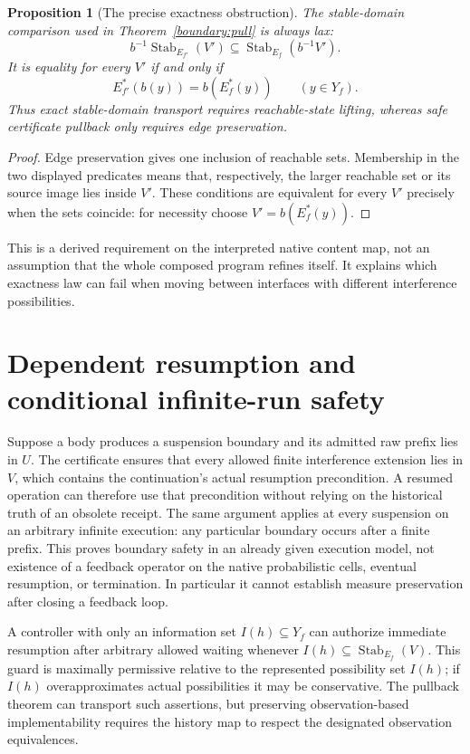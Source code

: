 \documentclass[11pt]{article}
\newtheorem{proposition}[theorem]{Proposition}
\newcommand{\Stab}{\operatorname{Stab}}
\begin{document}
\begin{proposition}[The precise exactness obstruction]
The stable-domain comparison used in Theorem~\ref{boundary:pull} is always lax:
\[
 b^{-1}\Stab_{E_{f'}}(V')\subseteq\Stab_{E_f}(b^{-1}V').
\]
It is equality for every $V'$ if and only if
\[
 E_{f'}^*(b(y))=b(E_f^*(y))\qquad(y\in Y_f).
\]
Thus exact stable-domain transport requires reachable-state lifting, whereas safe certificate pullback only requires edge preservation.
\end{proposition}
\begin{proof}
Edge preservation gives one inclusion of reachable sets. Membership in the two displayed predicates means that, respectively, the larger reachable set or its source image lies inside $V'$. These conditions are equivalent for every $V'$ precisely when the sets coincide: for necessity choose $V'=b(E_f^*(y))$.
\end{proof}
This is a derived requirement on the interpreted native content map, not an assumption that the whole composed program refines itself. It explains which exactness law can fail when moving between interfaces with different interference possibilities.

\section{Dependent resumption and conditional infinite-run safety}
Suppose a body produces a suspension boundary and its admitted raw prefix lies in $U$. The certificate ensures that every allowed finite interference extension lies in $V$, which contains the continuation's actual resumption precondition. A resumed operation can therefore use that precondition without relying on the historical truth of an obsolete receipt. The same argument applies at every suspension on an arbitrary infinite execution: any particular boundary occurs after a finite prefix. This proves boundary safety in an already given execution model, not existence of a feedback operator on the native probabilistic cells, eventual resumption, or termination. In particular it cannot establish measure preservation after closing a feedback loop.

A controller with only an information set $I(h)\subseteq Y_f$ can authorize immediate resumption after arbitrary allowed waiting whenever $I(h)\subseteq\Stab_{E_f}(V)$. This guard is maximally permissive relative to the represented possibility set $I(h)$; if $I(h)$ overapproximates actual possibilities it may be conservative. The pullback theorem can transport such assertions, but preserving observation-based implementability requires the history map to respect the designated observation equivalences.
\end{document}
